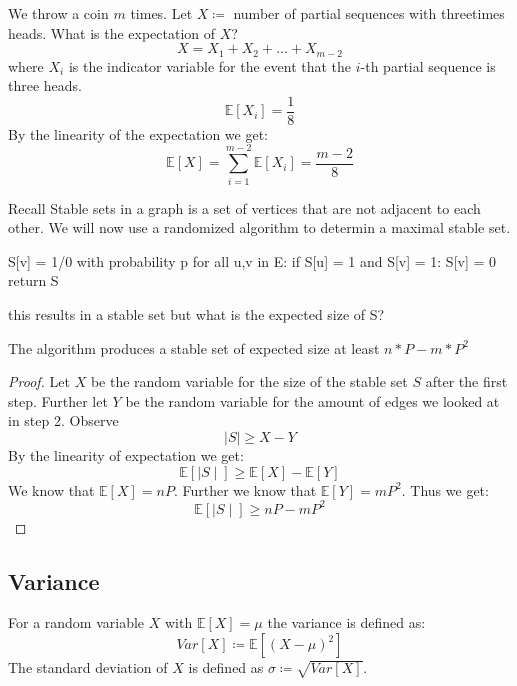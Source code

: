 \begin{example}
    We throw a coin $m$ times. Let $X \coloneqq$ number of partial sequences with threetimes heads. What is the expectation of $X$?
    $$X = X_1 + X_2 + \dots + X_{m-2}$$
    where $X_i$ is the indicator variable for the event that the $i$-th partial sequence is three heads.
    $$\mathbb{E}[X_i] = \frac{1}{8}$$
    By the linearity of the expectation we get:
    $$\mathbb{E}[X] = \sum_{i=1}^{m-2} \mathbb{E}[X_i] = \frac{m-2}{8}$$
\end{example}

\begin{remark}
    Recall Stable sets in a graph is a set of vertices that are not adjacent to each other. We will now use a randomized algorithm to determin a maximal stable set.
\end{remark}

\begin{algorithm}
S[v] = 1/0 with probability p
for all u,v in E:
    if S[u] = 1 and S[v] = 1:
        S[v] = 0
return S
\end{algorithm}

this results in a stable set but what is the expected size of S?

\begin{theorem}
    The algorithm produces a stable set of expected size at least $n*P-m*P^2$
\end{theorem}

\begin{proof}
    Let $X$ be the random variable for the size of the stable set $S$ after the first step. Further let $Y$ be the random variable for the amount of edges we looked at in step 2. Observe
    $$\mid S \mid  \geq X - Y$$
    By the linearity of expectation we get:
    $$\mathbb{E}[\mid S \mid] \geq \mathbb{E}[X] - \mathbb{E}[Y]$$
    We know that $\mathbb{E}[X] = nP$. Further we know that $\mathbb{E}[Y] = mP^2$. Thus we get:
    $$\mathbb{E}[\mid S \mid] \geq nP - mP^2$$
\end{proof}

\subsection{Variance}

\begin{definition}
    For a random variable $X$ with $\mathbb{E}[X] = \mu$ the variance is defined as:
    $$Var[X] \coloneqq \mathbb{E}[(X-\mu)^2]$$
    The standard deviation of $X$ is defined as $\sigma \coloneqq \sqrt{Var[X]}$.
\end{definition}

